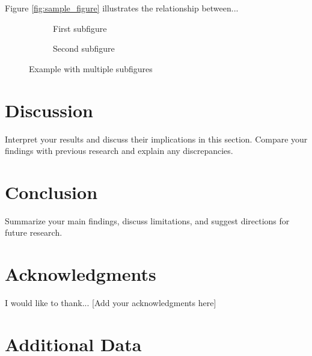 \documentclass[12pt,a4paper,twoside]{article}
\begin{document}
Figure \ref{fig:sample_figure} illustrates the relationship between...

\begin{figure}[htbp]
    \centering
    \begin{subfigure}[b]{0.45\textwidth}
        \centering
        \caption{First subfigure}
        \label{fig:subfig_a}
    \end{subfigure}
    \hfill
    \begin{subfigure}[b]{0.45\textwidth}
        \centering
        \caption{Second subfigure}
        \label{fig:subfig_b}
    \end{subfigure}
    \caption{Example with multiple subfigures}
    \label{fig:multiple_subfigs}
\end{figure}

\section{Discussion}
\label{sec:discussion}

Interpret your results and discuss their implications in this section. Compare your findings with previous research and explain any discrepancies.

\lipsum[7-8] %

\section{Conclusion}
\label{sec:conclusion}

Summarize your main findings, discuss limitations, and suggest directions for future research.

\lipsum[9] %

\section*{Acknowledgments}

I would like to thank... [Add your acknowledgments here]

\printbibliography
{}

\appendix
\section{Additional Data}
\label{app:additional_data}
\end{document}
